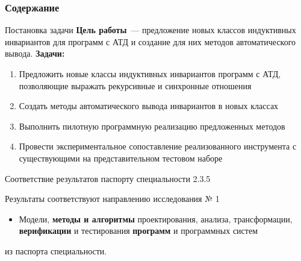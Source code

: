\documentclass[22pt,aspectratio=169]{beamer}
\begin{document}
\togglefalse{fastCompile}



\begin{frame}[plain]
\titlepage
\end{frame}

\begin{frame}
\frametitle{Содержание}
\tableofcontents[
subsectionstyle=show/show/hide
]
\end{frame}


\whenFullCompile{}


\begin{framesection}{Постановка задачи}
\textbf{Цель работы}~--- предложение новых классов индуктивных инвариантов для программ с АТД и создание для них методов автоматического вывода. \textbf{Задачи:}

\begin{enumerate}
\item Предложить новые классы индуктивных инвариантов программ с АТД, позволяющие выражать рекурсивные и синхронные отношения
\item Создать методы автоматического вывода инвариантов в новых классах
\item Выполнить пилотную программную реализацию предложенных методов
\item Провести экспериментальное сопоставление реализованного инструмента с существующими на представительном тестовом наборе
\end{enumerate}
\end{framesection}



\begin{frame}{Соответствие результатов паспорту специальности 2.3.5}

Результаты соответствуют направлению исследования  № 1
\begin{itemize}
\item Модели, \textbf{методы и алгоритмы} проектирования, анализа, трансформации, \textbf{верификации} и тестирования \textbf{программ} и программных систем
\end{itemize}
из паспорта специальности.
\end{frame}
\end{document}
